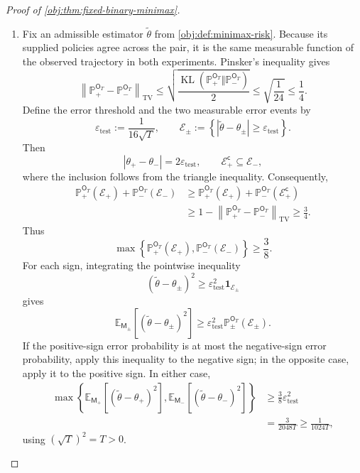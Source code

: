 \documentclass[11pt]{article}
\begin{document}
\begin{proof}[Proof of \cref{obj:thm:fixed-binary-minimax}]
\begin{enumerate}
\item Fix an admissible estimator \(\widetilde\theta\) from
\cref{obj:def:minimax-risk}. Because its supplied policies agree across the pair, it is the same measurable function of the observed trajectory in both experiments. Pinsker's inequality gives
\[
\left\|\mathbb P_+^{\mathsf O_T}
-\mathbb P_-^{\mathsf O_T}\right\|_{\mathrm{TV}}
\leq
\sqrt{\frac{
\operatorname{KL}(\mathbb P_+^{\mathsf O_T}
\Vert\mathbb P_-^{\mathsf O_T})}{2}}
\leq\sqrt{\frac1{24}}\leq\frac14.
\]
Define the error threshold and the two measurable error events by
\[
\varepsilon_{\mathrm{test}}:=\frac1{16\sqrt T},
\qquad
\mathcal E_\pm:=
\left\{|\widetilde\theta-\theta_\pm|
\geq\varepsilon_{\mathrm{test}}\right\}.
\]
Then
\[
|\theta_+-\theta_-|=2\varepsilon_{\mathrm{test}},
\qquad
\mathcal E_+^{\mathsf c}\subseteq\mathcal E_-,
\]
where the inclusion follows from the triangle inequality. Consequently,
\[
\begin{aligned}
\mathbb P_+^{\mathsf O_T}(\mathcal E_+)
+\mathbb P_-^{\mathsf O_T}(\mathcal E_-)
&\geq
\mathbb P_+^{\mathsf O_T}(\mathcal E_+)
+\mathbb P_-^{\mathsf O_T}(\mathcal E_+^{\mathsf c})\\
&\geq
1-\left\|\mathbb P_+^{\mathsf O_T}
-\mathbb P_-^{\mathsf O_T}\right\|_{\mathrm{TV}}
\geq\frac34.
\end{aligned}
\]
Thus
\[
\max\left\{
\mathbb P_+^{\mathsf O_T}(\mathcal E_+),
\mathbb P_-^{\mathsf O_T}(\mathcal E_-)
\right\}\geq\frac38.
\]
For each sign, integrating the pointwise inequality
\[
(\widetilde\theta-\theta_\pm)^2
\geq\varepsilon_{\mathrm{test}}^2\mathbf1_{\mathcal E_\pm}
\]
gives
\[
\mathbb E_{\mathsf M_\pm}
[(\widetilde\theta-\theta_\pm)^2]
\geq
\varepsilon_{\mathrm{test}}^2
\mathbb P_\pm^{\mathsf O_T}(\mathcal E_\pm).
\]
If the positive-sign error probability is at most the negative-sign error probability, apply this inequality to the negative sign; in the opposite case, apply it to the positive sign. In either case,
\[
\begin{aligned}
\max\left\{
\mathbb E_{\mathsf M_+}[(\widetilde\theta-\theta_+)^2],
\mathbb E_{\mathsf M_-}[(\widetilde\theta-\theta_-)^2]
\right\}
&\geq\frac38\varepsilon_{\mathrm{test}}^2\\
&=\frac3{2048T}
\geq\frac1{1024T},
\end{aligned}
\]
using \((\sqrt T)^2=T>0\).


\end{enumerate}
\end{proof}
\end{document}
